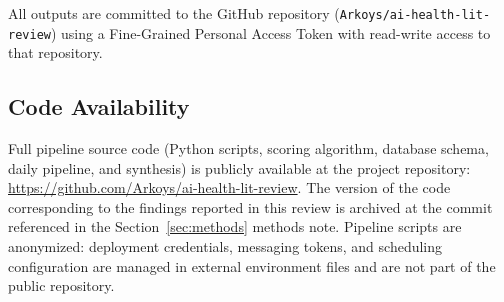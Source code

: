 All outputs are committed to the GitHub repository
(\texttt{Arkoys/ai-health-lit-review}) using a Fine-Grained Personal Access
Token with read-write access to that repository.


\subsection*{Code Availability}

Full pipeline source code (Python scripts, scoring algorithm, database
schema, daily pipeline, and synthesis) is publicly available at the
project repository: \url{https://github.com/Arkoys/ai-health-lit-review}.
The version of the code corresponding to the findings reported in this
review is archived at the commit referenced in the Section~\ref{sec:methods}
methods note. Pipeline scripts are anonymized: deployment credentials,
messaging tokens, and scheduling configuration are managed in
external environment files and are not part of the public repository.
